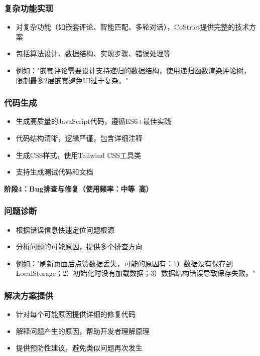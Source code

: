 \documentclass[12pt,a4paper]{article}
\begin{document}
\subsubsection{复杂功能实现}
\begin{itemize}
    \item 对复杂功能（如嵌套评论、智能匹配、多轮对话），CoStrict提供完整的技术方案
    \item 包括算法设计、数据结构、实现步骤、错误处理等
    \item 例如："嵌套评论需要设计支持递归的数据结构，使用递归函数渲染评论树，限制最多2层嵌套避免UI过于复杂。"
\end{itemize}

\subsubsection{代码生成}
\begin{itemize}
    \item 生成高质量的JavaScript代码，遵循ES6+最佳实践
    \item 代码结构清晰，逻辑严谨，包含详细注释
    \item 生成CSS样式，使用Tailwind CSS工具类
    \item 支持生成测试代码和文档
\end{itemize}

\textbf{阶段4：Bug排查与修复（使用频率：中等~高）}

\subsubsection{问题诊断}
\begin{itemize}
    \item 根据错误信息快速定位问题根源
    \item 分析问题的可能原因，提供多个排查方向
    \item 例如："刷新页面后点赞数据丢失，可能的原因有：1）数据没有保存到LocalStorage；2）初始化时没有加载数据；3）数据结构错误导致保存失败。"
\end{itemize}

\subsubsection{解决方案提供}
\begin{itemize}
    \item 针对每个可能原因提供详细的修复代码
    \item 解释问题产生的原因，帮助开发者理解原理
    \item 提供预防性建议，避免类似问题再次发生
\end{itemize}
\end{document}
